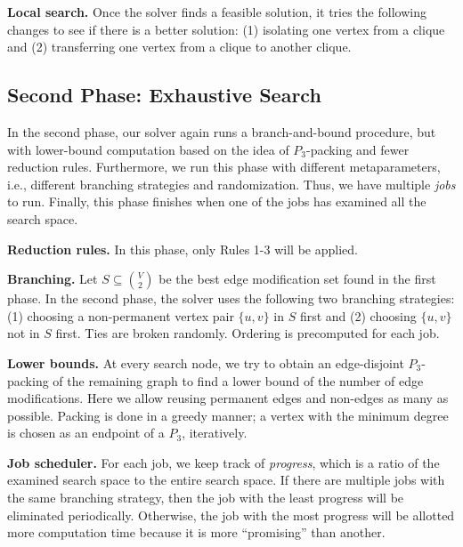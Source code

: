 \documentclass[a4paper,UKenglish,cleveref, autoref, thm-restate]{lipics-v2021}
\begin{document}
\textbf{Local search.} Once the solver finds a feasible solution, it tries the following changes to see if there is a better solution: (1) isolating one vertex from a clique and (2) transferring one vertex from a clique to another clique.


\enlargethispage{\baselineskip}

\subsection{Second Phase: Exhaustive Search}

In the second phase, our solver again runs a branch-and-bound procedure, but with lower-bound computation based on the idea of $P_3$-packing \cite{bevern2018parameterizing} and fewer reduction rules. Furthermore, we run this phase with different metaparameters, i.e., different branching strategies and randomization. Thus, we have multiple \textit{jobs} to run. Finally, this phase finishes when one of the jobs has examined all the search space.

\textbf{Reduction rules.} In this phase, only Rules 1-3 will be applied.

\textbf{Branching.} Let $S \subseteq \binom{V}{2}$ be the best edge modification set found in the first phase. In the second phase, the solver uses the following two branching strategies: (1) choosing a non-permanent vertex pair $\{u,v\}$ in $S$ first and (2) choosing $\{u,v\}$ not in $S$ first. Ties are broken randomly. Ordering is precomputed for each job.

\textbf{Lower bounds.} At every search node, we try to obtain an edge-disjoint $P_3$-packing of the remaining graph to find a lower bound of the number of edge modifications. Here we allow reusing permanent edges and non-edges as many as possible. Packing is done in a greedy manner; a vertex with the minimum degree is chosen as an endpoint of a $P_3$, iteratively.

\textbf{Job scheduler.} For each job, we keep track of \textit{progress}, which is a ratio of the examined search space to the entire search space. If there are multiple jobs with the same branching strategy, then the job with the least progress will be eliminated periodically. Otherwise, the job with the most progress will be allotted more computation time because it is more ``promising'' than another.




\end{document}
